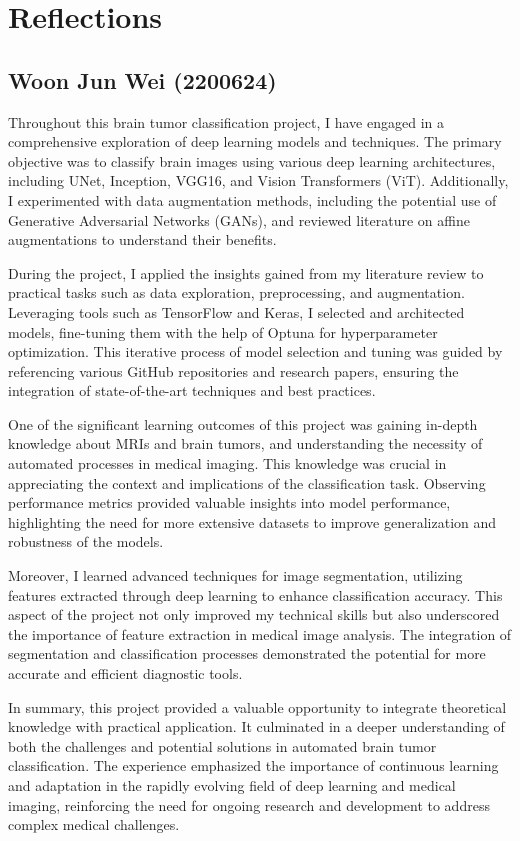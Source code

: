 \section{Reflections}\label{s:reflections}

\subsection{Woon Jun Wei (2200624)}

Throughout this brain tumor classification project, I have engaged in a comprehensive exploration of deep learning models and techniques. The primary objective was to classify brain images using various deep learning architectures, including UNet, Inception, VGG16, and Vision Transformers (ViT). Additionally, I experimented with data augmentation methods, including the potential use of Generative Adversarial Networks (GANs), and reviewed literature on affine augmentations to understand their benefits.

During the project, I applied the insights gained from my literature review to practical tasks such as data exploration, preprocessing, and augmentation. Leveraging tools such as TensorFlow and Keras, I selected and architected models, fine-tuning them with the help of Optuna for hyperparameter optimization. This iterative process of model selection and tuning was guided by referencing various GitHub repositories and research papers, ensuring the integration of state-of-the-art techniques and best practices.

One of the significant learning outcomes of this project was gaining in-depth knowledge about MRIs and brain tumors, and understanding the necessity of automated processes in medical imaging. This knowledge was crucial in appreciating the context and implications of the classification task. Observing performance metrics provided valuable insights into model performance, highlighting the need for more extensive datasets to improve generalization and robustness of the models.

Moreover, I learned advanced techniques for image segmentation, utilizing features extracted through deep learning to enhance classification accuracy. This aspect of the project not only improved my technical skills but also underscored the importance of feature extraction in medical image analysis. The integration of segmentation and classification processes demonstrated the potential for more accurate and efficient diagnostic tools.

In summary, this project provided a valuable opportunity to integrate theoretical knowledge with practical application. It culminated in a deeper understanding of both the challenges and potential solutions in automated brain tumor classification. The experience emphasized the importance of continuous learning and adaptation in the rapidly evolving field of deep learning and medical imaging, reinforcing the need for ongoing research and development to address complex medical challenges.


